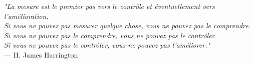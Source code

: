 




\vspace{2em}

\begin{flushright}
\textit{"La mesure est le premier pas vers le contrôle et éventuellement vers l'amélioration.\\
Si vous ne pouvez pas mesurer quelque chose, vous ne pouvez pas le comprendre.\\
Si vous ne pouvez pas le comprendre, vous ne pouvez pas le contrôler.\\
Si vous ne pouvez pas le contrôler, vous ne pouvez pas l'améliorer."}\\
\vspace{0.5em}
--- H. James Harrington
\end{flushright}